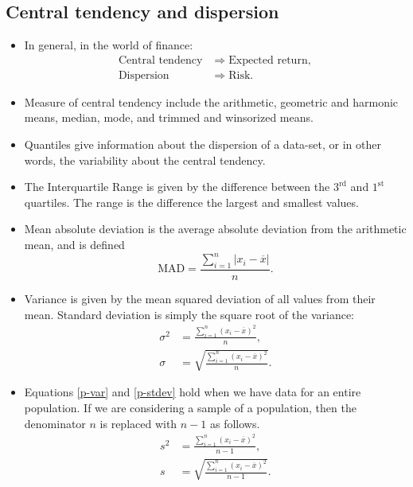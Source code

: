 \documentclass[../notes_compiled.tex]{subfiles}
\begin{document}
\subsection{Central tendency and dispersion}
\label{ssec-dispersion}
\begin{itemize}
\item In general, in the world of finance:
\begin{align*}
\text{Central tendency} &\Rightarrow \text{Expected return}, \\
\text{Dispersion} &\Rightarrow \text{Risk}.
\end{align*}
\item Measure of central tendency include the arithmetic, geometric and harmonic means, median, mode, and trimmed and winsorized means.
\item Quantiles give information about the dispersion of a data-set, or in other words, the variability about the central tendency.
\item The Interquartile Range is given by the difference between the $3^{\text{rd}}$ and $1^{\text{st}}$ quartiles. The range is the difference the largest and smallest values.
\item Mean absolute deviation is the average absolute deviation from the arithmetic mean, and is defined
\begin{equation}
\text{MAD} = \frac{\sum_{i=1}^{n}\left|x_{i}-\overline{x}\right|}{n}.
\end{equation}
\item Variance is given by the mean squared deviation of all values from their mean. Standard deviation is simply the square root of the variance:
\begin{align}
\sigma^{2} &= \frac{\sum_{i=1}^{n}\left(x_{i}-\overline{x}\right)^{2}}{n}, \label{p-var} \\
\sigma &= \sqrt{\frac{\sum_{i=1}^{n}\left(x_{i}-\overline{x}\right)^{2}}{n}}. \label{p-stdev}
\end{align}
\item Equations \ref{p-var} and \ref{p-stdev} hold when we have data for an entire population. If we are considering a sample of a population, then the denominator $n$ is replaced with $n-1$ as follows.
\begin{align}
s^{2} &= \frac{\sum_{i=1}^{n}\left(x_{i}-\overline{x}\right)^{2}}{n-1}, \label{s-var} \\
s &= \sqrt{\frac{\sum_{i=1}^{n}\left(x_{i}-\overline{x}\right)^{2}}{n-1}}. \label{s-stdev}
\end{align}

\end{itemize}
\end{document}
